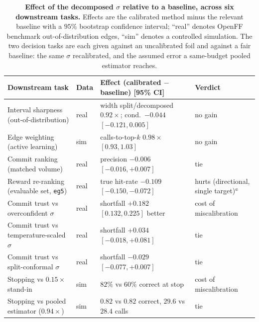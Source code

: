 \begin{table}[t]\centering
\caption{\textbf{Effect of the decomposed $\sigma$ relative to a baseline, across six
downstream tasks.} Effects are the calibrated method minus the relevant baseline with a
$95\%$ bootstrap confidence interval; ``real'' denotes OpenFF benchmark out-of-distribution
edges, ``sim'' denotes a controlled simulation. The two decision tasks are each given against
an uncalibrated foil and against a fair baseline: the same $\sigma$ recalibrated, and the
assumed error a same-budget pooled estimator reaches.}
\label{tab:audit}
\small
\begin{tabular}{@{}p{3.1cm}lp{5.4cm}p{2.6cm}@{}}
\toprule
Downstream task & Data & Effect (calibrated $-$ baseline) [95\% CI] & Verdict \\
\midrule
Interval sharpness (out-of-distribution) & real & width split/decomposed $0.92\times$; cond.\ $-0.044$ $[-0.121,0.005]$ & no gain \\
Edge weighting (active learning) & sim & calls-to-top-$k$ $0.98\times$ $[0.93,1.03]$ & no gain \\
Commit ranking (matched volume) & real & precision $-0.006$ $[-0.016,+0.007]$ & tie \\
Reward re-ranking (evaluable set, \texttt{eg5}) & real & true hit-rate $-0.109$ $[-0.150,-0.072]$ & hurts (directional, single target)$^{a}$ \\
\midrule
Commit trust vs overconfident $\sigma$ & real & shortfall $+0.182$ $[0.132,0.225]$ better & cost of miscalibration \\
Commit trust vs temperature-scaled $\sigma$ & real & shortfall $+0.034$ $[-0.018,+0.081]$ & tie \\
Commit trust vs split-conformal $\sigma$ & real & shortfall $-0.029$ $[-0.077,+0.007]$ & tie \\
Stopping vs $0.15\times$ stand-in & sim & $82\%$ vs $60\%$ correct at stop & cost of miscalibration \\
Stopping vs pooled estimator ($0.94\times$) & sim & $0.82$ vs $0.82$ correct, $29.6$ vs $28.4$ calls & tie \\
\bottomrule
\end{tabular}

\smallskip
{}
\end{table}


